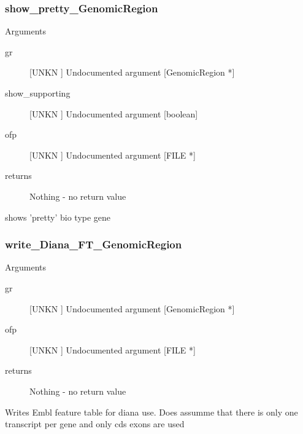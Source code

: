 \subsubsection{show_pretty_GenomicRegion}

Arguments
\begin{description}
\item[gr] [UNKN ] Undocumented argument [GenomicRegion *]
\item[show_supporting] [UNKN ] Undocumented argument [boolean]
\item[ofp] [UNKN ] Undocumented argument [FILE *]
\item[returns] Nothing - no return value
\end{description}


shows 'pretty' bio type gene


\subsubsection{write_Diana_FT_GenomicRegion}

Arguments
\begin{description}
\item[gr] [UNKN ] Undocumented argument [GenomicRegion *]
\item[ofp] [UNKN ] Undocumented argument [FILE *]
\item[returns] Nothing - no return value
\end{description}
Writes Embl feature table for diana use. Does assumme that
there is only one transcript per gene and only
cds exons are used



